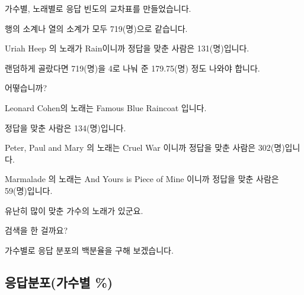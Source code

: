\documentclass[
]{book}
\begin{document}
가수별, 노래별로 응답 빈도의 교차표를 만들었습니다.

행의 소계나 열의 소계가 모두 719(명)으로 같습니다.

Uriah Heep 의 노래가 Rain이니까 정답을 맞춘 사람은 131(명)입니다.

랜덤하게 골랐다면 719(명)을 4로 나눠 준 179.75(명) 정도 나와야 합니다.

어떻습니까?

Leonard Cohen의 노래는 Famous Blue Raincoat 입니다.

정답을 맞춘 사람은 134(명)입니다.

Peter, Paul and Mary 의 노래는 Cruel War 이니까 정답을 맞춘 사람은 302(명)입니다.

Marmalade 의 노래는 And Yours is Piece of Mine 이니까 정답을 맞춘 사람은 59(명)입니다.

유난히 많이 맞춘 가수의 노래가 있군요.

검색을 한 걸까요?

가수별로 응답 분포의 백분율을 구해 보겠습니다.

\subsection{응답분포(가수별 \%)}\label{uxc751uxb2f5uxbd84uxd3ecuxac00uxc218uxbcc4}
\end{document}
